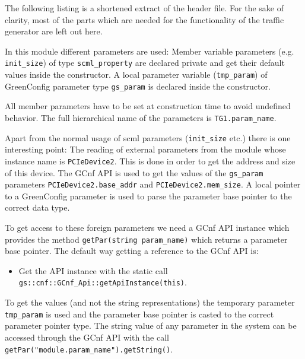 The following listing is a shortened extract of the header file. For
the sake of clarity, most
of the parts which are needed for the functionality of the traffic
generator are left out here.

In this module different parameters are used: Member variable parameters (e.g. \lstinline|init_size|) of type \lstinline|scml_property| are declared private and get their default values inside the constructor. A local parameter variable (\lstinline|tmp_param|) of GreenConfig parameter type \lstinline|gs_param| is declared inside the constructor.

All member parameters have to be set at construction time to avoid undefined behavior. The full hierarchical name of the parameters is \lstinline|TG1.param_name|.

Apart from the normal usage of scml parameters
(\lstinline|init_size| etc.) there is one interesting point: The
reading of external parameters from the module whose instance name is
\lstinline|PCIeDevice2|. This is done in order to get the address and
size of this device.  The GCnf API is used to get the values of the
\lstinline|gs_param| parameters \lstinline|PCIeDevice2.base_addr|
and \lstinline|PCIeDevice2.mem_size|. A local pointer to a
GreenConfig parameter is used to parse the parameter base pointer to the
correct data type.

To get access to these foreign parameters we need a GCnf API instance which
provides the method \lstinline|getPar(string param_name)| which
returns a parameter base pointer. The default way getting a reference to the GCnf API
is:
\begin{itemize}
	\item Get the API instance with the static call \lstinline[language=TeX]|gs::cnf::GCnf_Api::getApiInstance(this)|.
\end{itemize}

To get the values (and not the string representations) the temporary parameter \lstinline|tmp_param| is used and the parameter base pointer is casted to the correct parameter pointer type. The string value of any parameter in the system can be accessed through the GCnf API with the call \lstinline[language=TeX]|getPar("module.param_name").getString()|. 

